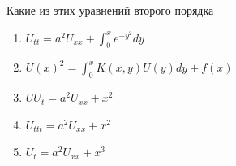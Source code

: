 Какие из этих уравнений второго порядка

\begin{enumerate}[label=\arabic*)]
    \item \(U_{tt}=a^2U_{xx}+\int_{0}^{x} e^{-y^2}dy\)
    \item \(U\left(x\right)^2=\int_{0}^{x} K\left(x,y\right)U\left(y\right)dy+f\left(x\right)\)
    \item \(UU_t=a^2U_{xx}+x^2\)
    \item \(U_{ttt}=a^2U_{xx}+x^2\)
    \item \(U_t=a^2U_{xx}+x^3\)
\end{enumerate}

